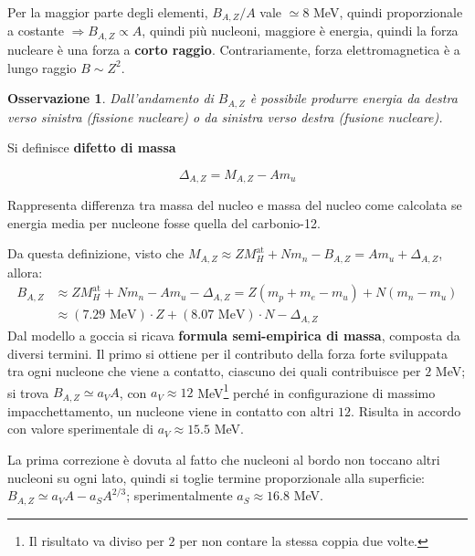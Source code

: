 \documentclass[10pt, a4paper]{scrartcl}
\numberwithin{equation}{subsection}
\theoremstyle{style1}
\newtheorem{osservazione}{Osservazione}[section]
\newenvironment{boxenv}[1][]{
    \begin{eqbox}[#1]
    }{
   \end{eqbox}
}
\begin{document}
\noindent Per la maggior parte degli elementi, $B_{A,Z} / A$ vale $\simeq 8 $ MeV, quindi proporzionale a costante $\Rightarrow B_{A,Z} \propto A$, quindi pi\`u nucleoni, maggiore \`e energia, quindi la forza nucleare \`e una forza a \textbf{corto raggio}. Contrariamente, forza elettromagnetica \`e a lungo raggio $B \sim Z^2$.

\begin{osservazione}
	Dall'andamento di $B_{A,Z} $ \`e possibile produrre energia da destra verso sinistra (fissione nucleare) o da sinistra verso destra (fusione nucleare).
\end{osservazione}

\noindent Si definisce \textbf{difetto di massa} 
\begin{boxenv}[]
\begin{equation}
	\Delta _{A,Z}  = M_{A,Z} - A m_u 
\end{equation}
\end{boxenv}
\noindent Rappresenta differenza tra massa del nucleo e massa del nucleo come calcolata se energia media per nucleone fosse quella del carbonio-12.

Da questa definizione, visto che $M_{A,Z} \approx Z M_H^\text{at}+Nm_n - B_{A,Z}=Am_u + \Delta _{A,Z}$, allora:
\begin{equation}
	\begin{split}
		B_{A,Z} &\approx ZM_H^\text{at} + Nm_n-Am_u - \Delta _{A,Z} = Z(m_p + m_e - m_u) + N(m_n - m_u)\\
					      &\approx (7.29 \text{ MeV}) \cdot Z + (8.07 \text{ MeV}) \cdot N - \Delta _{A,Z} 
	\end{split}
\end{equation}
Dal modello a goccia si ricava \textbf{formula semi-empirica di massa}, composta da diversi termini. Il primo si ottiene per il contributo della forza forte sviluppata tra ogni nucleone che viene a contatto, ciascuno dei quali contribuisce per $2$ MeV; si trova $B_{A,Z} \simeq a_V A$, con $a_V\approx 12$ MeV\footnote{Il risultato va diviso per $2$ per non contare la stessa coppia due volte.} perch\'e in configurazione di massimo impacchettamento, un nucleone viene in contatto con altri $12$. Risulta in accordo con valore sperimentale di $a_V \approx 15.5$ MeV.

La prima correzione \`e dovuta al fatto che nucleoni al bordo non toccano altri nucleoni su ogni lato, quindi si toglie termine proporzionale alla superficie: $B_{A,Z} \simeq a_V A - a_S A^{2 / 3} $; sperimentalmente $a_S \approx 16.8$ MeV. 
\end{document}
